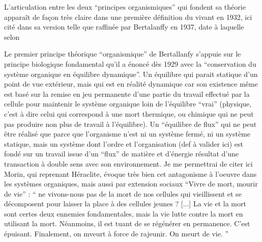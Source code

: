 
L'articulation entre les deux \enquote{principes organismiques} qui fondent sa théorie apparaît de façon très claire dans une première définition du vivant en 1932, ici cité dans sa version telle que raffinée par Bertalanffy en 1937, date à laquelle selon


Le premier principe théorique \enquote{organismique} de Bertallanfy s'appuie sur le principe biologique fondamental qu'il a énoncé dès 1929 avec la \enquote{conservation du système organique en équilibre dynamique}. Un équilibre qui parait statique d'un point de vue extérieur, mais qui est en réalité dynamique car son existence même est basé sur la remise en jeu permanente d'une partie du travail effectué par la cellule pour maintenir le système organique loin de l'équilibre \enquote{vrai} (physique, c'est à dire celui qui correspond à une mort thermique, ou chimique qui ne peut pas produire non plus de travail à l'équilibre). Un \enquote{équilibre de flux} qui ne peut être réalisé que parce que l'organisme n'est ni un système fermé, ni un système statique, mais un système dont l'ordre et l'organisation (def à valider ici) est fondé sur un travail issue d'un \enquote{flux} de matière et d'énergie résultat d'une transaction à double sens avec son environnement. \autocite[472]{Pouvreau2013} Je me permettrai de citer ici Morin, qui reprenant Héraclite, évoque très bien cet antagonisme à l'oeuvre dans les systèmes organiques, mais aussi par extension sociaux \enquote{Vivre de mort, mourir de vie} : \enquote{ ne vivons-nous pas de la mort de nos cellules qui vieillissent et se décomposent pour laisser la place à des cellules jeunes ? [...] La vie et la mort sont certes deux ennemies fondamentales, mais la vie lutte contre la mort en utilisant la mort. Néanmoins, il est tuant de se régénérer en permanence. C’est épuisant. Finalement, on mveurt à force de rajeunir. On meurt de vie. } \autocite{MorinXX}

